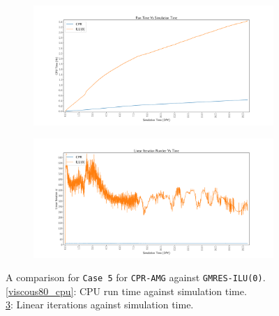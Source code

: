 \begin{figure}
\centering
\begin{subfigure}[b]{\textwidth}
   \includegraphics[width=1\linewidth]{figures/viscous/80x80/cpu_time.pdf}
   \caption{}
   \label{viscouse80_cpu}
\end{subfigure}

\begin{subfigure}[b]{\textwidth}
   \includegraphics[width=1\linewidth]{figures/viscous/80x80/its_time.pdf}
   \caption{}
   \label{viscous80_its}
\end{subfigure}

\caption[caption]{A comparison for \texttt{Case 5} for \texttt{CPR-AMG} against \texttt{GMRES-ILU(0)}.\\\hspace{\textwidth}
	\cref{viscous80_cpu}: CPU run time against simulation time. \\\hspace{\textwidth}
	\cref{viscous80_its}: Linear iterations against simulation time.\\\hspace{\textwidth}}
\end{figure}

